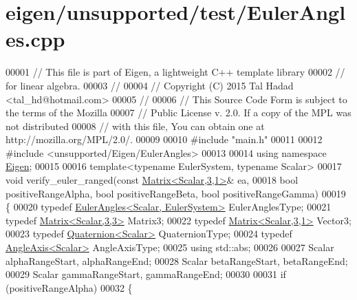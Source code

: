 \hypertarget{eigen_2unsupported_2test_2_euler_angles_8cpp_source}{}\section{eigen/unsupported/test/\+Euler\+Angles.cpp}
\label{eigen_2unsupported_2test_2_euler_angles_8cpp_source}

\begin{DoxyCode}
00001 \textcolor{comment}{// This file is part of Eigen, a lightweight C++ template library}
00002 \textcolor{comment}{// for linear algebra.}
00003 \textcolor{comment}{//}
00004 \textcolor{comment}{// Copyright (C) 2015 Tal Hadad <tal\_hd@hotmail.com>}
00005 \textcolor{comment}{//}
00006 \textcolor{comment}{// This Source Code Form is subject to the terms of the Mozilla}
00007 \textcolor{comment}{// Public License v. 2.0. If a copy of the MPL was not distributed}
00008 \textcolor{comment}{// with this file, You can obtain one at http://mozilla.org/MPL/2.0/.}
00009 
00010 \textcolor{preprocessor}{#include "main.h"}
00011 
00012 \textcolor{preprocessor}{#include <unsupported/Eigen/EulerAngles>}
00013 
00014 \textcolor{keyword}{using namespace }\hyperlink{namespace_eigen}{Eigen};
00015 
00016 \textcolor{keyword}{template}<\textcolor{keyword}{typename} EulerSystem, \textcolor{keyword}{typename} Scalar>
00017 \textcolor{keywordtype}{void} verify\_euler\_ranged(\textcolor{keyword}{const} \hyperlink{group___core___module}{Matrix<Scalar,3,1>}& ea,
00018   \textcolor{keywordtype}{bool} positiveRangeAlpha, \textcolor{keywordtype}{bool} positiveRangeBeta, \textcolor{keywordtype}{bool} positiveRangeGamma)
00019 \{
00020   \textcolor{keyword}{typedef} \hyperlink{class_eigen_1_1_euler_angles}{EulerAngles<Scalar, EulerSystem>} EulerAnglesType;
00021   \textcolor{keyword}{typedef} \hyperlink{group___core___module_class_eigen_1_1_matrix}{Matrix<Scalar,3,3>} Matrix3;
00022   \textcolor{keyword}{typedef} \hyperlink{group___core___module}{Matrix<Scalar,3,1>} Vector3;
00023   \textcolor{keyword}{typedef} \hyperlink{group___geometry___module_class_eigen_1_1_quaternion}{Quaternion<Scalar>} QuaternionType;
00024   \textcolor{keyword}{typedef} \hyperlink{group___geometry___module_class_eigen_1_1_angle_axis}{AngleAxis<Scalar>} AngleAxisType;
00025   \textcolor{keyword}{using} std::abs;
00026   
00027   Scalar alphaRangeStart, alphaRangeEnd;
00028   Scalar betaRangeStart, betaRangeEnd;
00029   Scalar gammaRangeStart, gammaRangeEnd;
00030   
00031   \textcolor{keywordflow}{if} (positiveRangeAlpha)
00032   \{

\end{DoxyCode}
